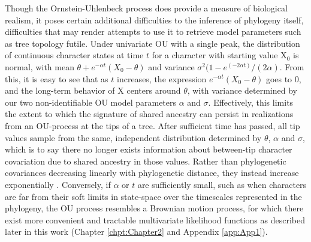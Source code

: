 Though the Ornstein-Uhlenbeck process does provide a measure of biological realism, it poses certain additional difficulties to the inference of phylogeny itself, difficulties that may render attempts to use it to retrieve model parameters such as tree topology futile. Under univariate OU with a single peak, the distribution of continuous character states at time $t$ for a character with starting value X$_0$ is normal, with mean $\theta + e^{-\alpha t}(X_0 - \theta)$ and variance $\sigma^2(1-e^{(-2\alpha t)} / (2\alpha)$. From this, it is easy to see that as $t$ increases, the expression $e^{-\alpha t}(X_0 - \theta)$ goes to 0, and the long-term behavior of X centers around $\theta$, with variance determined by our two non-identifiable OU model parameters $\alpha$ and $\sigma$. Effectively, this limits the extent to which the signature of shared ancestry can persist in realizations from an OU-process at the tips of a tree. After sufficient time has passed, all tip values sample from the same, independent distribution determined by $\theta$, $\alpha$ and $\sigma$, which is to say there no longer exists information about between-tip character covariation due to shared ancestry in those values. Rather than phylogenetic covariances decreasing linearly with phylogenetic distance, they instead increase exponentially \citep{hansenTranslatingMicroevolutionaryProcess1996}. Conversely, if $\alpha$ or $t$ are sufficiently small, such as when characters are far from their soft limits in state-space over the timescales represented in the phylogeny, the OU process resembles a Brownian motion process, for which there exist more convenient and tractable multivariate likelihood functions as described later in this work (Chapter \ref{chpt:Chapter2} and Appendix \ref{app:App1}). 

